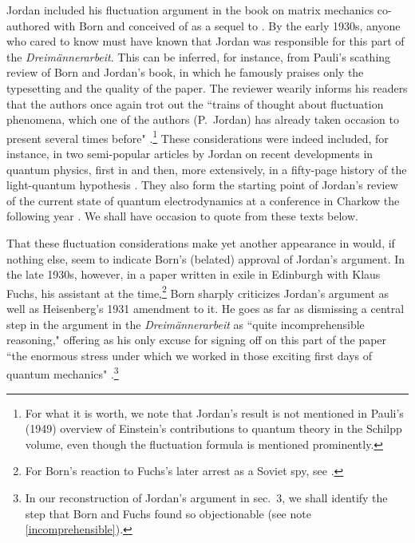 \documentclass[12pt]{elsart}
\begin{document}
Jordan included his fluctuation argument in the book on matrix mechanics co-authored with Born and conceived of as a sequel to \citep{Born 1925} \citep[sec.\ 73, pp.\ 392--400]{Born and Jordan 1930}. By the early 1930s, anyone who cared to know must have known that Jordan was responsible for this part of the {\it Dreim\"annerarbeit}. This can be inferred, for instance, from Pauli's scathing review of Born and Jordan's book, in which he famously praises only the typesetting and the quality of the paper. The reviewer wearily informs his readers that the authors once again trot out the ``trains of thought about fluctuation phenomena, which one of the authors (P.\ Jordan) has already taken occasion to present several times before" \citep{Pauli 1930}.\footnote{For what it is worth, we note that Jordan's result is not mentioned in Pauli's (1949) overview of Einstein's contributions to quantum theory in the Schilpp volume, even though the fluctuation formula is mentioned prominently.}
These considerations were indeed included, for instance, in two semi-popular articles by Jordan on recent developments in quantum physics, first in \citep[p.\ 642]{Jordan 1927b} and then, more extensively, in a fifty-page history of the light-quantum hypothesis \citep[sec.\ 13, pp.\ 192--196]{Jordan 1928}. They 
also form the starting point of Jordan's review of the current state of quantum electrodynamics at a conference in Charkow the following year \citep[pp.\ 700-702]{Jordan 1929}. We shall have occasion to quote from these texts below.

That these fluctuation considerations make yet another appearance in \citep{Born and Jordan 1930} would, if nothing else, seem to indicate Born's (belated) approval of Jordan's argument. In the late 1930s, however, in a paper written in exile in Edinburgh with  Klaus Fuchs, his assistant at the time,\footnote{For Born's reaction to Fuchs's later arrest as a Soviet spy, see \citep[p.\ 288]{Born 1978}.}
Born sharply criticizes Jordan's argument as well as Heisenberg's 1931 amendment to it. He goes as far as dismissing a central step in the argument in the {\it Dreim\"annerarbeit} as ``quite incomprehensible reasoning," offering as his  only excuse for signing off on this part of the paper ``the enormous stress under which we worked in those exciting first days of quantum mechanics" \citep[p.\ 263]{Born and Fuchs 1939a}.\footnote{\label{born complaint}In our reconstruction  of Jordan's argument in sec.\ 3, we shall identify the step that Born and Fuchs found so objectionable (see note \ref{incomprehensible}).} 
\end{document}
